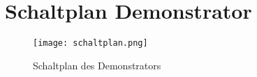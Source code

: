 \newpage
\section{Schaltplan Demonstrator}
\label{sys_sec:Demonstrator_Aufbau}

\begin{figure}[H]
\centering
\texttt{[image: schaltplan.png]}
\caption{Schaltplan des Demonstrators}
\end{figure}

